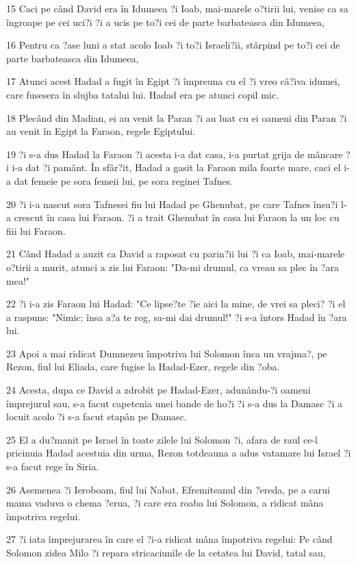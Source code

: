 \par 15 Caci pe când David era în Idumeea ?i Ioab, mai-marele o?tirii lui, venise ca sa îngroape pe cei uci?i ?i a ucis pe to?i cei de parte barbateasca din Idumeea,
\par 16 Pentru ca ?ase luni a stat acolo Ioab ?i to?i Israeli?ii, stârpind pe to?i cei de parte barbateasca din Idumeea,
\par 17 Atunci acest Hadad a fugit în Egipt ?i împreuna cu el ?i vreo câ?iva idumei, care fusesera în slujba tatalui lui. Hadad era pe atunci copil mic.
\par 18 Plecând din Madian, ei au venit la Paran ?i au luat cu ei oameni din Paran ?i au venit în Egipt la Faraon, regele Egiptului.
\par 19 ?i s-a dus Hadad la Faraon ?i acesta i-a dat casa, i-a purtat grija de mâncare ?i i-a dat ?i pamânt. În sfâr?it, Hadad a gasit la Faraon mila foarte mare, caci el i-a dat femeie pe sora femeii lui, pe sora reginei Tafnes.
\par 20 ?i i-a nascut sora Tafnesei fiu lui Hadad pe Ghenubat, pe care Tafnes însu?i l-a crescut în casa lui Faraon. ?i a trait Ghenubat în casa lui Faraon la un loc cu fiii lui Faraon.
\par 21 Când Hadad a auzit ca David a raposat cu parin?ii lui ?i ca Ioab, mai-marele o?tirii a murit, atunci a zis lui Faraon: "Da-mi drumul, ca vreau sa plec în ?ara mea!"
\par 22 ?i i-a zis Faraon lui Hadad: "Ce lipse?te ?ie aici la mine, de vrei sa pleci? ?i el a raspuns: "Nimic; însa a?a te rog, sa-mi dai drumul!" ?i s-a întors Hadad în ?ara lui.
\par 23 Apoi a mai ridicat Dumnezeu împotriva lui Solomon înca un vrajma?, pe Rezon, fiul lui Eliada, care fugise la Hadad-Ezer, regele din ?oba.
\par 24 Acesta, dupa ce David a zdrobit pe Hadad-Ezer, adunându-?i oameni împrejurul sau, s-a facut capetenia unei bande de ho?i ?i s-a dus la Damasc ?i a locuit acolo ?i s-a facut stapân pe Damasc.
\par 25 El a du?manit pe Israel în toate zilele lui Solomon ?i, afara de raul ce-l pricinuia Hadad acestuia din urma, Rezon totdeauna a adus vatamare lui Israel ?i s-a facut rege în Siria.
\par 26 Asemenea ?i Ieroboam, fiul lui Nabat, Efremiteanul din ?ereda, pe a carui mama vaduva o chema ?erua, ?i care era roaba lui Solomon, a ridicat mâna împotriva regelui.
\par 27 ?i iata împrejurarea în care el ?i-a ridicat mâna împotriva regelui: Pe când Solomon zidea Milo ?i repara stricaciunile de la cetatea lui David, tatal sau,
